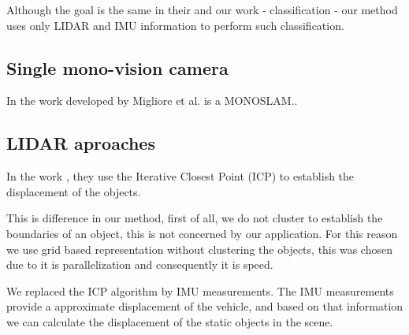 Although the goal is the same in their and our work - classification - our method uses only LIDAR and IMU information to perform such classification.

\subsection{Single mono-vision camera}

In the work developed by Migliore et al. \cite{Migliore_2009_ICRA} is a MONOSLAM.. 

\subsection{LIDAR aproaches}

In the work \cite{4650636}, they use the Iterative Closest Point (ICP) \cite{10.1109/34.121791} to establish the displacement of the objects. 

This is difference in our method, first of all, we do not cluster to establish the boundaries of an object, this is not concerned by our application. For this reason we use grid based representation without clustering the objects, this was chosen due to it is parallelization and consequently it is speed.

We replaced the ICP algorithm by IMU measurements. The IMU measurements provide a approximate displacement of the vehicle, and based on that information we can calculate the displacement of the static objects in the scene.  
